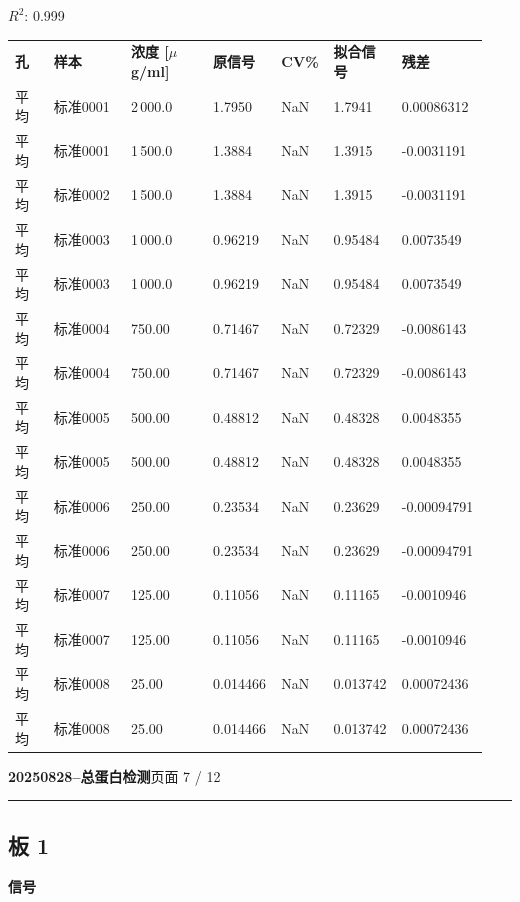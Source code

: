 \documentclass[UTF8,10pt,a4paper,fontset=fandol]{ctexart}
\begin{document}
\medskip

$R^2$: 0.999

\medskip

\small
\begin{tabular}{@{}p{0.08\linewidth}p{0.16\linewidth}p{0.17\linewidth}p{0.14\linewidth}p{0.10\linewidth}p{0.14\linewidth}p{0.15\linewidth}@{}}
\textbf{孔} & \textbf{样本} & \textbf{浓度 [$\mu$g/ml]} & \textbf{原信号} & \textbf{CV\%} & \textbf{拟合信号} & \textbf{残差} \\
平均 & 标准0001 & 2\,000.0 & 1.7950 & NaN & 1.7941 & 0.00086312 \\
平均 & 标准0001 & 1\,500.0 & 1.3884 & NaN & 1.3915 & -0.0031191 \\
平均 & 标准0002 & 1\,500.0 & 1.3884 & NaN & 1.3915 & -0.0031191 \\
平均 & 标准0003 & 1\,000.0 & 0.96219 & NaN & 0.95484 & 0.0073549 \\
平均 & 标准0003 & 1\,000.0 & 0.96219 & NaN & 0.95484 & 0.0073549 \\
平均 & 标准0004 & 750.00 & 0.71467 & NaN & 0.72329 & -0.0086143 \\
平均 & 标准0004 & 750.00 & 0.71467 & NaN & 0.72329 & -0.0086143 \\
平均 & 标准0005 & 500.00 & 0.48812 & NaN & 0.48328 & 0.0048355 \\
平均 & 标准0005 & 500.00 & 0.48812 & NaN & 0.48328 & 0.0048355 \\
平均 & 标准0006 & 250.00 & 0.23534 & NaN & 0.23629 & -0.00094791 \\
平均 & 标准0006 & 250.00 & 0.23534 & NaN & 0.23629 & -0.00094791 \\
平均 & 标准0007 & 125.00 & 0.11056 & NaN & 0.11165 & -0.0010946 \\
平均 & 标准0007 & 125.00 & 0.11056 & NaN & 0.11165 & -0.0010946 \\
平均 & 标准0008 & 25.00 & 0.014466 & NaN & 0.013742 & 0.00072436 \\
平均 & 标准0008 & 25.00 & 0.014466 & NaN & 0.013742 & 0.00072436 \\
\end{tabular}
\normalsize

\newpage

\begin{center}
\textbf{20250828--总蛋白检测}\hfill 页面 7 / 12
\end{center}
\hrule

\subsection*{板 1}
\textbf{信号}
\end{document}
